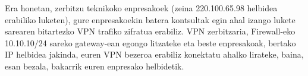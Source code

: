Era honetan, zerbitzu teknikoko enpresakoek (zeina 220.100.65.98 helbidea erabiliko luketen), gure enpresakoekin batera kontsultak egin ahal izango lukete sarearen bitartezko VPN trafiko zifratua erabiliz. VPN zerbitzaria, Firewall-eko 10.10.10/24 sareko gateway-ean egongo litzateke eta beste enpresakoak, bertako IP helbidea jakinda, euren VPN bezeroa erabiliz konektatu ahalko lirateke, baina, esan bezala, bakarrik euren enpresako helbidetik.